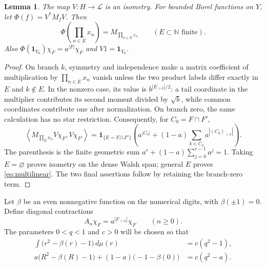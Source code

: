 \documentclass[11pt,letterpaper]{amsart}
\newtheorem{lemma}[theorem]{Lemma}
\theoremstyle{definition}
\theoremstyle{remark}
\numberwithin{equation}{section}
\begin{document}
\begin{lemma}\label{lem:walsh}
The map \(V:H\to\mathcal L\) is an isometry. For bounded Borel
functions on \(Y\), let \(\Phi(f)=V^*M_fV\). Then
\begin{equation}\label{eq:multilinear}
 \Phi\left(\prod_{n\in E}x_n\right)
                  =M_{\prod_{n\in E}\varepsilon_n}
              \qquad(E\subset\mathbb N\text{ finite}).
\end{equation}
Also \(\Phi(\mathbf1_{Y_0})\chi_F=a^{|F|}\chi_F\) and
\(V1=\mathbf1_{Y_0}\).
\end{lemma}
\begin{proof}
On branch \(k\), symmetry and independence make a matrix coefficient
of multiplication by \(\prod_{n\in E}x_n\) vanish unless the two
product labels differ exactly in \(E\) and \(k\notin E\).
In the nonzero case, its value is \(b^{|E_{>k}|/2}\): a tail
coordinate in the multiplier contributes its second moment
divided by \(\sqrt b\), while common coordinates contribute one
after normalization. On branch zero, the same calculation has no
star restriction. Consequently, for \(C_0=F\cap F'\),
\[
 \left\langle M_{\prod_E x_n}V\chi_F,V\chi_{F'}\right\rangle
 =\mathbf1_{\{E=F\triangle F'\}}
 \left(a^{|C_0|}+(1-a)\sum_{k\in C_0}a^{|(C_0)_{>k}|}\right).
\]
The parenthesis is the finite geometric sum
\(a^r+(1-a)\sum_{j=0}^{r-1}a^j=1\).
Taking \(E=\varnothing\) proves isometry on the dense Walsh span;
general \(E\) proves \eqref{eq:multilinear}.
The two final assertions follow by retaining the branch-zero term.
\end{proof}

Let \(\beta\) be an even nonnegative function on the numerical
digits, with \(\beta(\pm1)=0\). Define diagonal contractions
\[
                  A_n\chi_F=a^{|F_{>n}|}\chi_F\qquad(n\ge0).
\]
The parameters \(0<q<1\) and \(c>0\) will be chosen so that
\begin{equation}\label{eq:conditions}
 \begin{aligned}
 \int\bigl(r^2-\beta(r)-1\bigr)\,d\mu(r)
                                      &=c(q^2-1),\\
 a\bigl(R^2-\beta(R)-1\bigr)
       +(1-a)\bigl(-1-\beta(0)\bigr)&=c(q^2-a).
 \end{aligned}
\end{equation}
\end{document}
